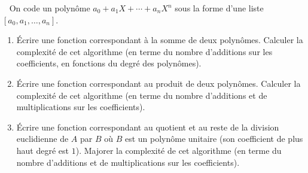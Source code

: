 \documentclass[class=report,crop=false]{standalone}
\begin{document}
\begin{tp}~
On code un polynôme $a_0+a_1X+\cdots + a_n X^n$ sous la forme d'une liste $[a_0,a_1,\ldots,a_n]$.
\begin{enumerate}
  \item \'Ecrire une fonction correspondant à la somme de deux polynômes. Calculer la complexité
  de cet algorithme (en terme du nombre d'additions sur les coefficients, en fonctions du degré des polynômes).

  \item \'Ecrire une fonction correspondant au produit de deux polynômes. Calculer la complexité
  de cet algorithme (en terme du nombre d'additions et de multiplications sur les coefficients).

  \item \'Ecrire une fonction correspondant au quotient et au reste de la division euclidienne de $A$ par
  $B$ où   $B$ est un polynôme unitaire (son coefficient de plus haut degré est $1$).
  Majorer la complexité de cet algorithme (en terme du nombre d'additions et de multiplications sur les coefficients).
\end{enumerate}

\end{tp}
\end{document}
